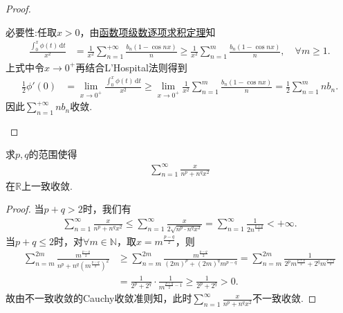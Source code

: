 \documentclass[../../main.tex]{subfiles}
\begin{document}
\begin{proof}
\begin{enumerate}
{\heiti 必要性:}任取\( x > 0 \)，由\hyperref[theorem:函数项级数逐项求积定理]{函数项级数逐项求积定理}知
\begin{align*}
\frac{\int_{0}^{x} \phi(t) \, \mathrm{d}t}{x^2} &= \frac{1}{x^2} \sum_{n=1}^{+\infty} \frac{b_n (1 - \cos nx)}{n} \geqslant \frac{1}{x^2} \sum_{n=1}^{m} \frac{b_n (1 - \cos nx)}{n}, \quad \forall m \geqslant 1.
\end{align*}
上式中令\( x \to 0^+ \)再结合L'Hospital法则得到
\begin{align*}
\frac{1}{2} \phi'(0) &= \lim_{x \to 0^+} \frac{\int_{0}^{x} \phi(t) \, \mathrm{d}t}{x^2} \geqslant \lim_{x \to 0^+} \frac{1}{x^2} \sum_{n=1}^{m} \frac{b_n (1 - \cos nx)}{n} = \frac{1}{2} \sum_{n=1}^{m} nb_n.
\end{align*}
因此\( \sum_{n=1}^{+\infty} nb_n \)收敛.
\end{enumerate}

\end{proof}

\begin{example}
求$p,q$的范围使得
\begin{align*}
\sum_{n=1}^{\infty} \frac{x}{n^p + n^q x^2}
\end{align*}
在$\mathbb{R}$上一致收敛.
\end{example}
\begin{proof}
当$p+q>2$时，我们有
\begin{align*}
\sum_{n=1}^{\infty}{\frac{x}{n^p+n^qx^2}}\leqslant \sum_{n=1}^{\infty}{\frac{x}{2\sqrt{n^p\cdot n^qx^2}}}=\sum_{n=1}^{\infty}{\frac{1}{2n^{\frac{p+q}{2}}}}<+\infty .
\end{align*}
当$p+q\leqslant 2$时，对$\forall m\in \mathbb{N}$，取$x=m^{\frac{p-q}{2}}$，则
\begin{align*}
\sum_{n=m}^{2m}{\frac{m^{\frac{p-q}{2}}}{n^p+n^q\left( m^{\frac{p-q}{2}} \right) ^2}}&\geqslant \sum_{n=m}^{2m}{\frac{m^{\frac{p-q}{2}}}{\left( 2m \right) ^p+\left( 2m \right) ^qm^{p-q}}}=\sum_{n=m}^{2m}{\frac{1}{2^pm^{\frac{p+q}{2}}+2^qm^{\frac{p+q}{2}}}}
\\
&=\frac{1}{2^p+2^q}\cdot \frac{1}{m^{\frac{p+q}{2}-1}}\geqslant \frac{1}{2^p+2^q}>0.
\end{align*}
故由不一致收敛的Cauchy收敛准则知，此时$\sum_{n=1}^{\infty}{\frac{x}{n^p+n^qx^2}}$不一致收敛.

\end{proof}
\end{document}
